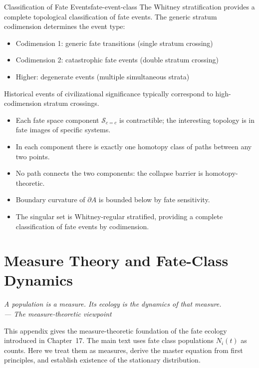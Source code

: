 \documentclass[12pt,twoside,openright]{book}
\newcommand{\fateSpace}{\mathcal{S}}
\newcommand{\collapseInd}{c}             %
\newcommand{\admRegion}{A}
\newcommand{\fateComp}[1]{\fateSpace_{\collapseInd=#1}}
\newenvironment{epigraph}[2]{%
  \vspace{1em}\begin{flushright}
  \begin{minipage}{0.72\textwidth}
  \itshape\small #1\\[0.4em]
  \upshape\footnotesize\sffamily\color{DistGray}--- #2
  \end{minipage}\end{flushright}\vspace{1.5em}}{}
\providecommand{\fateComp}[1]{\fateSpace_{\collapseInd=#1}}
\providecommand{\admRegion}{A}
\newenvironment{appsummary}{%
  \begin{tcolorbox}[colback=DistBlue!5,colframe=DistBlue,
    title={\faBookOpen\enspace Appendix Summary},
    fonttitle=\sffamily\bfseries\color{white},
    attach boxed title to top left={yshift=-2mm,xshift=4mm},
    boxed title style={colback=DistBlue,rounded corners}]
  \begin{itemize}[nosep,leftmargin=*]}{%
  \end{itemize}\end{tcolorbox}}
\begin{document}
\begin{remark}{Classification of Fate Events}{fate-event-class}
The Whitney stratification provides a complete topological
classification of fate events. The generic stratum codimension
determines the event type:
\begin{itemize}[nosep,leftmargin=2em]
  \item Codimension 1: generic fate transitions (single
    stratum crossing)
  \item Codimension 2: catastrophic fate events (double
    stratum crossing)
  \item Higher: degenerate events (multiple simultaneous
    strata)
\end{itemize}
Historical events of civilizational significance typically
correspond to high-codimension stratum crossings.
\end{remark}

\begin{appsummary}
\item Each fate space component $\fateComp{c}$ is
  contractible; the interesting topology is in fate
  images of specific systems.
\item In each component there is exactly one homotopy
  class of paths between any two points.
\item No path connects the two components: the collapse
  barrier is homotopy-theoretic.
\item Boundary curvature of $\partial\admRegion$ is
  bounded below by fate sensitivity.
\item The singular set is Whitney-regular stratified,
  providing a complete classification of fate events by
  codimension.
\end{appsummary}


\chapter{Measure Theory and Fate-Class Dynamics}
\label{app:measure}

\begin{epigraph}{A population is a measure. Its ecology is
  the dynamics of that measure.}{The measure-theoretic
  viewpoint}
\end{epigraph}

This appendix gives the measure-theoretic foundation of the
fate ecology introduced in Chapter~17. The main text uses
fate class populations $N_i(t)$ as counts. Here we treat
them as measures, derive the master equation from first
principles, and establish existence of the stationary
distribution.
\end{document}
